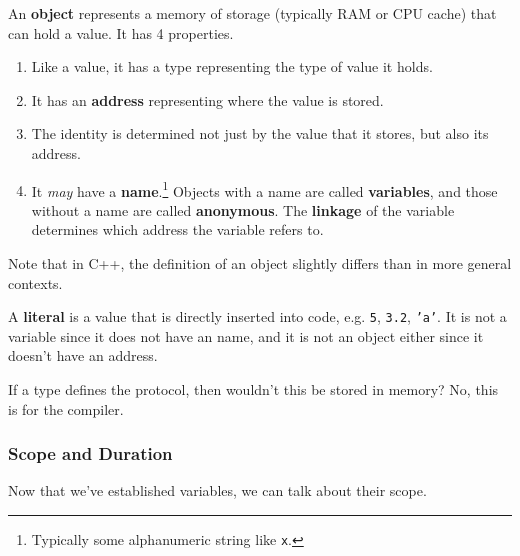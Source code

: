 \documentclass{article}
\begin{document}
      \begin{definition}
        An \textbf{object} represents a memory of storage (typically RAM or CPU cache) that can hold a value. It has 4 properties. 
        \begin{enumerate}
          \item Like a value, it has a type representing the type of value it holds. 
          \item It has an \textbf{address} representing where the value is stored.  
          \item The identity is determined not just by the value that it stores, but also its address. 
          \item It \textit{may} have a \textbf{name}.\footnote{Typically some alphanumeric string like \texttt{x}.} Objects with a name are called \textbf{variables}, and those without a name are called \textbf{anonymous}. The \textbf{linkage} of the variable determines which address the variable refers to. 
        \end{enumerate}
        Note that in C++, the definition of an object slightly differs than in more general contexts. 
      \end{definition} 

      \begin{definition}[Literal]
        A \textbf{literal} is a value that is directly inserted into code, e.g. \texttt{5}, \texttt{3.2}, \texttt{'a'}. It is not a variable since it does not have an name, and it is not an object either since it doesn't have an address. 
      \end{definition} 

      \begin{theorem}
        If a type defines the protocol, then wouldn't this be stored in memory? No, this is for the compiler.  
      \end{theorem}

    \subsubsection{Scope and Duration} 

      Now that we've established variables, we can talk about their scope. 
      
      \begin{definition}[Block]
        
      \end{definition}
\end{document}
